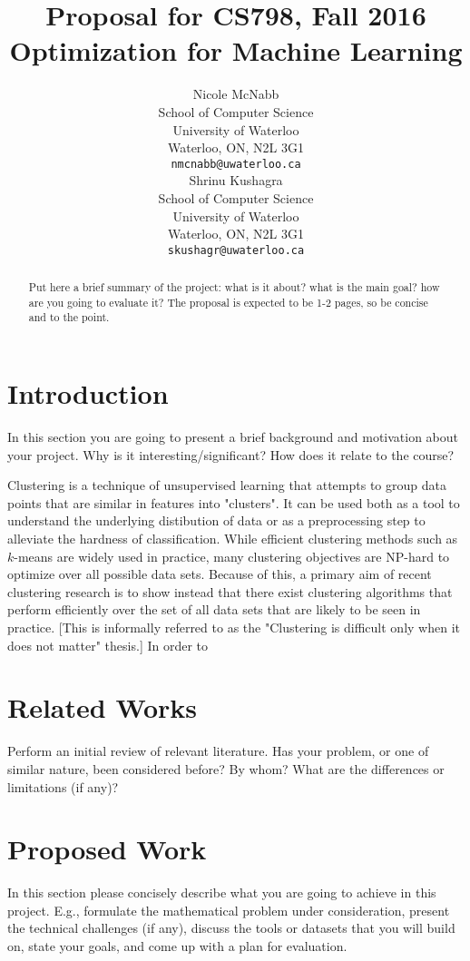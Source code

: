 \documentclass{article}
\title{Proposal for CS798, Fall 2016\\ \large Optimization for Machine Learning}
\author{
	Nicole McNabb \\
	School of Computer Science\\
	University of Waterloo\\
	Waterloo, ON, N2L 3G1 \\
	\texttt{nmcnabb@uwaterloo.ca} \\
	\And
	Shrinu Kushagra\\
	School of Computer Science\\
	University of Waterloo\\
	Waterloo, ON, N2L 3G1 \\
	\texttt{skushagr@uwaterloo.ca} \\	
}
\begin{document}
\maketitle

\begin{abstract} 
Put here a brief summary of the project: what is it about? what is the main goal? how are you going to evaluate it? The proposal is expected to be 1-2 pages, so be concise and to the point.
\end{abstract} 

\section{Introduction}
In this section you are going to present a brief background and motivation about your project. Why is it interesting/significant? How does it relate to the course?

Clustering is a technique of unsupervised learning that attempts to group data points that are similar in features into "clusters". It can be used both as a tool to understand the underlying distibution of data or as a preprocessing step to alleviate the hardness of classification. While efficient clustering methods such as $k$-means are widely used in practice, many clustering objectives are NP-hard to optimize over all possible data sets. Because of this, a primary aim of recent clustering research is to show instead that there exist  clustering algorithms that perform efficiently over the set of all data sets that are likely to be seen in practice. [This is informally referred to as the "Clustering is difficult only when it does not matter" thesis.] In order to 

\section{Related Works}
Perform an initial review of relevant literature. Has your problem, or one of similar nature, been considered before? By whom? What are the differences or limitations (if any)? 

\section{Proposed Work}
In this section please concisely describe what you are going to achieve in this project. E.g., formulate the mathematical problem under consideration, present the technical challenges (if any), discuss the tools or datasets that you will build on, state your goals, and come up with a plan for evaluation.
\end{document}

